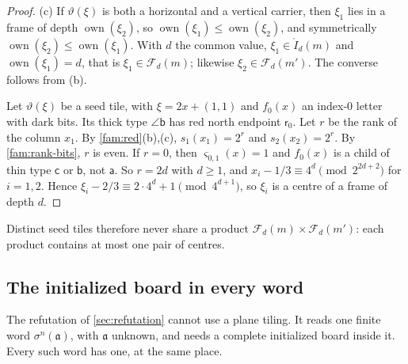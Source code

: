 \begin{proof}
(c) If $\vartheta(\xi)$ is both a horizontal and a vertical carrier, then $\xi_1$ lies in a frame of depth $\operatorname{own}(\xi_2)$, so $\operatorname{own}(\xi_1)\le\operatorname{own}(\xi_2)$, and symmetrically $\operatorname{own}(\xi_2)\le\operatorname{own}(\xi_1)$. With $d$ the common value, $\xi_1\in\mathring I_d(m)$ and $\operatorname{own}(\xi_1)=d$, that is $\xi_1\in\mathcal F_d(m)$; likewise $\xi_2\in\mathcal F_d(m')$. The converse follows from (b).

Let $\vartheta(\xi)$ be a seed tile, with $\xi=2x+(1,1)$ and $f_0(x)$ an index-$0$ letter with dark bits. Its thick type $\angle\mathsf b$ has red north endpoint $\mathsf r_0$. Let $r$ be the rank of the column $x_1$. By \cref{fam:red}(b),(c), $s_1(x_1)=2^r$ and $s_2(x_2)=2^r$. By \cref{fam:rank-bits}, $r$ is even. If $r=0$, then $\varsigma_{0,1}(x)=1$ and $f_0(x)$ is a child of thin type $\mathsf c$ or $\mathsf b$, not $\mathsf a$. So $r=2d$ with $d\ge1$, and $x_i-1/3\equiv4^d\pmod{2^{2d+2}}$ for $i=1,2$. Hence $\xi_i-2/3\equiv2\cdot4^d+1\pmod{4^{d+1}}$, so $\xi_i$ is a centre of a frame of depth $d$.
\end{proof}

Distinct seed tiles therefore never share a product $\mathcal F_d(m)\times\mathcal F_d(m')$: each product contains at most one pair of centres.

\subsection{The initialized board in every word}\label{fam:sub-board}

The refutation of \cref{sec:refutation} cannot use a plane tiling. It reads one finite word $\sigma^n(\mathfrak a)$, with $\mathfrak a$ unknown, and needs a complete initialized board inside it. Every such word has one, at the same place.

